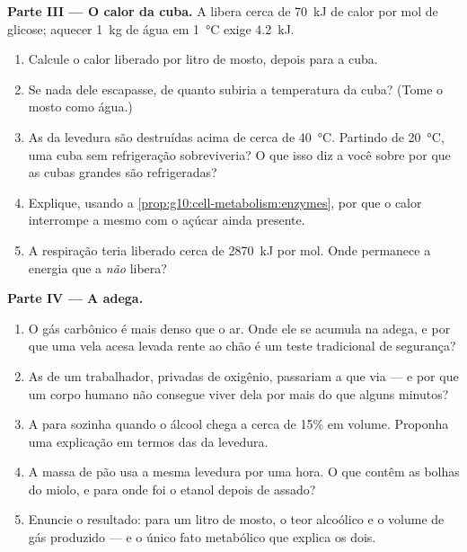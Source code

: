 \begin{problem}
\medskip
\noindent\textbf{Parte III --- O calor da cuba.}
A  libera cerca de \qty{70}{kJ} de calor por mol de glicose;
aquecer \qty{1}{kg} de água em \qty{1}{\celsius} exige \qty{4.2}{kJ}.
\begin{enumerate}[resume]
  \item Calcule o calor liberado por litro de mosto, depois para a
        cuba.
  \item Se nada dele escapasse, de quanto subiria a temperatura da
        cuba? (Tome o mosto como água.)
  \item As  da levedura são destruídas acima de cerca de
        \qty{40}{\celsius}. Partindo de \qty{20}{\celsius}, uma cuba
        sem refrigeração sobreviveria? O que isso diz a você sobre por
        que as cubas grandes são refrigeradas?
  \item Explique, usando a \cref{prop:g10:cell-metabolism:enzymes}, por
        que o calor interrompe a  mesmo com o açúcar ainda
        presente.
  \item A respiração teria liberado cerca de \qty{2870}{kJ} por mol.
        Onde permanece a energia que a  \emph{não} libera?
\end{enumerate}

\medskip
\noindent\textbf{Parte IV --- A adega.}
\begin{enumerate}[resume]
  \item O gás carbônico é mais denso que o ar. Onde ele se acumula na
        adega, e por que uma vela acesa levada rente ao chão é um teste
        tradicional de segurança?
  \item As  de um trabalhador, privadas de oxigênio, passariam a
        que via --- e por que um corpo humano não consegue viver dela
        por mais do que alguns minutos?
  \item A  para sozinha quando o álcool chega a cerca de
        15\% em volume. Proponha uma explicação em termos das 
        da levedura.
  \item A massa de pão usa a mesma levedura por uma hora. O que contêm
        as bolhas do miolo, e para onde foi o etanol depois de assado?
  \item Enuncie o resultado: para um litro de mosto, o teor alcoólico e
        o volume de gás produzido --- e o único fato metabólico que
        explica os dois.
\end{enumerate}
\end{problem}
